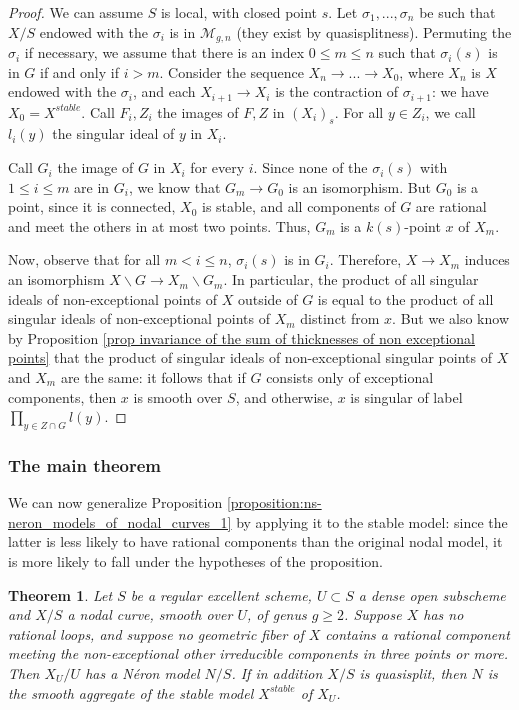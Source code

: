 \documentclass[a4paper,10pt,twoside]{article}
\newcommand{\ra}{\rightarrow}
\newtheorem{thm}{Theorem}[section]
\theoremstyle{definition}
\theoremstyle{remark}
\begin{document}
\begin{proof}
We can assume $S$ is local, with closed point $s$. Let $\sigma_1,...,\sigma_n$ be such that $X/S$ endowed with the $\sigma_i$ is in $\mathcal{M}_{g,n}$ (they exist by quasisplitness). Permuting the $\sigma_i$ if necessary, we assume that there is an index $0\leq m\leq n$ such that $\sigma_i(s)$ is in $G$ if and only if $i> m$. Consider the sequence $X_n\ra...\ra X_0$, where $X_n$ is $X$ endowed with the $\sigma_i$, and each $X_{i+1}\ra X_i$ is the contraction of $\sigma_{i+1}$: we have $X_0=X^{stable}$. Call $F_i,Z_i$ the images of $F,Z$ in $(X_i)_s$. For all $y\in Z_i$, we call $l_i(y)$ the singular ideal of $y$ in $X_i$.

Call $G_i$ the image of $G$ in $X_i$ for every $i$. Since none of the $\sigma_i(s)$ with $1\leq i\leq m$ are in $G_i$, we know that $G_m\ra G_0$ is an isomorphism. But $G_0$ is a point, since it is connected, $X_0$ is stable, and all components of $G$ are rational and meet the others in at most two points. Thus, $G_m$ is a $k(s)$-point $x$ of $X_m$.

Now, observe that for all $m<i\leq n$, $\sigma_i(s)$ is in $G_i$. Therefore, $X\ra X_m$ induces an isomorphism $X\backslash G\ra X_m\backslash G_m$. In particular, the product of all singular ideals of non-exceptional points of $X$ outside of $G$ is equal to the product of all singular ideals of non-exceptional points of $X_m$ distinct from $x$. But we also know by Proposition \ref{prop invariance of the sum of thicknesses of non exceptional points} that the product of singular ideals of non-exceptional singular points of $X$ and $X_m$ are the same: it follows that if $G$ consists only of exceptional components, then $x$ is smooth over $S$, and otherwise, $x$ is singular of label $\prod\limits_{y\in Z\cap G}l(y)$.
\end{proof}

\subsubsection{The main theorem}

We can now generalize Proposition \ref{proposition:ns-neron_models_of_nodal_curves_1} by applying it to the stable model: since the latter is less likely to have rational components than the original nodal model, it is more likely to fall under the hypotheses of the proposition.

\begin{thm}\label{Theorem:ns_neron_models_of_nodal_curves}
Let $S$ be a regular excellent scheme, $U\subset S$ a dense open subscheme and $X/S$ a nodal curve, smooth over $U$, of genus $g\geq 2$. Suppose $X$ has no rational loops, and suppose no geometric fiber of $X$ contains a rational component meeting the non-exceptional other irreducible components in three points or more. Then $X_U/U$ has a N\'eron model $N/S$. If in addition $X/S$ is quasisplit, then $N$ is the smooth aggregate of the stable model $X^{stable}$ of $X_U$.
\end{thm}
\end{document}
